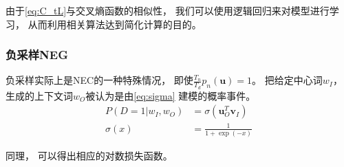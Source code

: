 由于\cref{eq:C_tL}与交叉熵函数的相似性，
我们可以使用逻辑回归来对模型进行学习，
从而利用相关算法达到简化计算的目的。

\subsubsection{负采样NEG}

负采样实际上是NEC的一种特殊情况，
即使$\frac{T_n}{T_d}p_n\left(\mathbf{u}\right)=1$。
把给定中心词$w_I$，
生成的上下文词$w_O$被认为是由\cref{eq:sigma}
建模的概率事件。
\begin{equation}
    \label{eq:sigma}
    \begin{aligned}
        P\left(D=1|w_I,w_O\right) & = \sigma\left(\mathbf{u}_O^T\mathbf{v}_I\right) \\
        \sigma(x)                 & =\frac{1}{1+\exp(-x)}
    \end{aligned}
\end{equation}

同理，
可以得出相应的对数损失函数。
